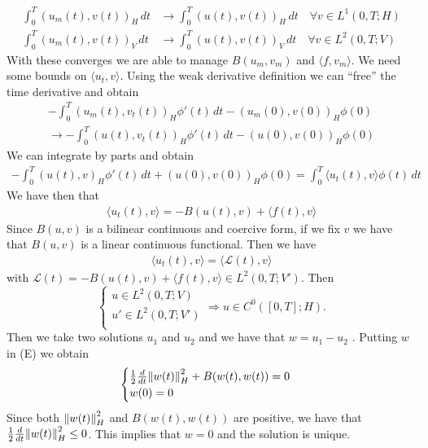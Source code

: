 \begin{enumerate}
\begin{align*}
              \int_0^T \left(u_m(t), v(t)\right)_H \, dt & \to \int_0^T \left(u(t), v(t)\right)_H \, dt \quad \forall v \in L^1(0, T; H) \\
              \int_0^T \left(u_m(t), v(t)\right)_V \, dt & \to \int_0^T \left(u(t), v(t)\right)_V \, dt \quad \forall v \in L^2(0, T; V)
          \end{align*}
          With these converges we are able to manage \(B(u_m, v_m)\) and \(\langle f, v_m \rangle\). We need some bounds on \(\langle u_t, v \rangle\). Using the weak derivative definition we can ``free'' the time derivative and obtain
          \[
              \begin{split}
                  - \int_0^T \left(u_m(t), v_t(t)\right)_H \phi'(t) \, dt - \left(u_m(0), v(0)\right)_H \phi(0) \\\to -\int_0^T \left(u(t), v_t(t)\right)_H \phi'(t) \, dt - \left(u(0), v(0)\right)_H \phi(0)
              \end{split}
          \]
          We can integrate by parts and obtain
          \[
              \begin{split}
                  -\int_0^T \left(u(t), v\right)_H \phi'(t) \, dt + \left(u(0), v(0)\right)_H \phi(0) = \int_0^T \langle u_t(t), v \rangle \phi(t) \, dt
              \end{split}
          \]
          We have then that
          \[
              \begin{split}
                  \langle u_t(t), v \rangle = - B(u(t), v) + \langle f(t), v \rangle
              \end{split}
          \]
          Since \(B(u,v)\) is a bilinear continuous and coercive form, if we fix \(v\) we
          have that \(B(u, v)\) is a linear continuous functional. Then we have
          \[
              \begin{split}
                  \langle u_t(t), v \rangle = \langle \mathcal{L}(t), v \rangle
              \end{split}
          \]
          with \(\mathcal{L}(t) = -B(u(t), v) + \langle f(t), v \rangle \in L^2(0, T;
          V')\). Then
          \[
              \begin{cases}
                  u \in L^2(0, T; V)   \\
                  u' \in L^2(0, T; V') \\
              \end{cases}
              \Rightarrow u \in C^0([0, T]; H).
          \]
          Then we take two solutions \(u_1\) and \(u_2\) and we have that \(w = u_1 -
          u_2\) . Putting \(w\) in (E) we obtain
          \[
              \begin{cases}
                  \frac{1}{2} \frac{d}{dt} \norm{w(t)}_H^2 + B(w(t), w(t)) = 0 \\
                  w(0) = 0
              \end{cases}
          \]
          Since both \(\norm{w(t)}_H^2\) and \(B(w(t), w(t))\) are positive, we have that
          \(\frac{1}{2} \frac{d}{dt} \norm{w(t)}_H^2 \leq 0\). This implies that \(w =
          0\) and the solution is unique.
\end{enumerate}

